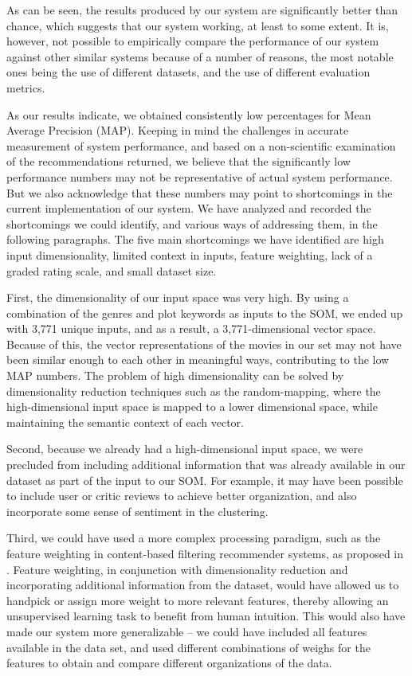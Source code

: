 \documentclass[conference]{IEEEtran}
\begin{document}
As can be seen, the results produced by our system are significantly better than chance, which suggests that our system working, at least to some extent. It is, however, not possible to empirically compare the performance of our system against other similar systems because of a number of reasons, the most notable ones being the use of different datasets, and the use of different evaluation metrics. 

As our results indicate, we obtained consistently low percentages for Mean Average Precision (MAP). Keeping in mind the challenges in accurate measurement of system performance, and based on a non-scientific examination of the recommendations returned, we believe that the significantly low performance numbers may not be representative of actual system performance. But we also acknowledge that these numbers may point to shortcomings in the current implementation of our system. We have analyzed and recorded the shortcomings we could identify, and various ways of addressing them, in the following paragraphs. The five main shortcomings we have identified are high input dimensionality, limited context in inputs, feature weighting, lack of a graded rating scale, and small dataset size.

First, the dimensionality of our input space was very high. By using a combination of the genres and plot keywords as inputs to the SOM, we ended up with 3,771 unique inputs, and as a result, a 3,771-dimensional vector space. Because of this, the vector representations of the movies in our set may not have been similar enough to each other in meaningful ways, contributing to the low MAP numbers. The problem of high dimensionality can be solved by dimensionality reduction techniques such as the random-mapping, where the high-dimensional input space is mapped to a lower dimensional space, while maintaining the semantic context of each vector.

Second, because we already had a high-dimensional input space, we were precluded from including additional information that was already available in our dataset as part of the input to our SOM. For example, it may have been possible to include user or critic reviews to achieve better organization, and also incorporate some sense of sentiment in the clustering.

Third, we could have used a more complex processing paradigm, such as the feature weighting in content-based filtering recommender systems, as proposed in \cite{}. Feature weighting, in conjunction with dimensionality reduction and incorporating additional information from the dataset, would have allowed us to handpick or assign more weight to more relevant features, thereby allowing an unsupervised learning task to benefit from human intuition. This would also have made our system more generalizable – we could have included all features available in the data set, and used different combinations of weighs for the features to obtain and compare different organizations of the data.
\end{document}
